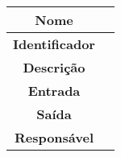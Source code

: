 {            \begin{table}[H]
                \centering
                \caption{}
                \begin{tabular}{c|p{10cm}}
                    \hline
                    \textbf{Nome}            & \\
                    \hline
                    \textbf{Identificador} & \\ 
                    \hline
                    \textbf{Descrição}   & \\ 
                    \hline
                    \textbf{Entrada}           & \\
                    \hline
                    \textbf{Saída}            &  \\
                    \hline
                    \textbf{Responsável}            & \\
                    \hline                    
                \end{tabular}
            \end{table}




}



